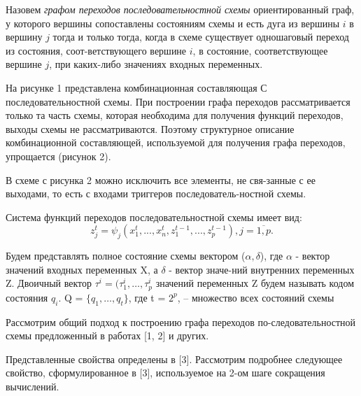 \documentclass[a4paper, 14pt]{article}
\begin{document}
Назовем \textit{графом переходов последовательностной схемы} ориентированный граф, у которого вершины сопоставлены состояниям схемы и есть дуга из вершины $i$ в вершину $j$ тогда и только тогда, когда в схеме существует одношаговый переход из состояния, соот-ветствующего вершине $i$, в состояние, соответствующее вершине $j$, при каких-либо значениях входных переменных.

На рисунке 1 представлена комбинационная составляющая С
последовательностной схемы. При построении графа переходов
рассматривается только та часть схемы, которая необходима для
получения функций переходов, выходы схемы не рассматриваются.
Поэтому структурное описание комбинационной составляющей,
используемой для получения графа переходов, упрощается (рисунок
2).
\begin{figure}[h]
\begin{minipage}[h]{0.49\linewidth}
\end{minipage}
\hfill
\begin{minipage}[h]{0.49\linewidth}
\end{minipage}
\label{ris:image1}
\end{figure}

В схеме с рисунка 2 можно исключить все элементы, не свя-занные с ее выходами, то есть с входами триггеров последователь-ностной схемы.

Система функций переходов последовательностной схемы имеет вид:
\begin{equation}
    z^t_{j}=\psi_{j}(x^t_{1},...,x^t_{n},z^{t-1}_{1},...,z^{t-1}_{p}),j=\overline{1,p}.
\end{equation}

Будем представлять полное состояние схемы вектором ($\alpha,\delta$), где $\alpha$ - вектор значений входных переменных X, а $\delta$ - вектор значе-ний внутренних переменных Z.
Двоичный вектор $\tau^i = (\tau^i_{1},\dots,\tau^i_{p}$
значений переменных Z будем
называть кодом состояния $q_{i}$. Q = $\{q_{1},\dots,q_{t}\}$, где t = $2^p$, – множество всех состояний схемы

Рассмотрим общий подход к построению графа переходов по-следовательностной схемы предложенный в работах [1, 2] и других.

Представленные свойства определены в [3].
Рассмотрим подробнее следующее свойство, сформулированное
в [3], используемое на 2-ом шаге сокращения вычислений.
\end{document}
